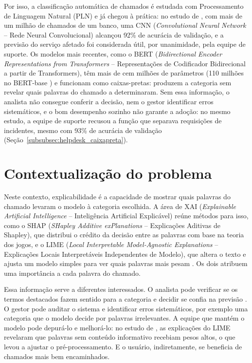 \documentclass[
    12pt,                %
    openright,           %
    oneside,             %
    a4paper,             %
    english,             %
    brazil               %
]{abntex2}
\begin{document}
Por isso, a classificação automática de chamados é estudada com Processamento de Linguagem Natural (PLN) e já chegou à prática: no estudo de , com mais de um milhão de chamados de um banco, uma CNN (\textit{Convolutional Neural Network} -- Rede Neural Convolucional) alcançou 92\% de acurácia de validação, e a previsão do serviço afetado foi considerada útil, por unanimidade, pela equipe de suporte. Os modelos mais recentes, como o BERT (\textit{Bidirectional Encoder Representations from Transformers} -- Representações de Codificador Bidirecional a partir de Transformers), têm mais de cem milhões de parâmetros (110 milhões no BERT-base \cite{devlin2019}) e funcionam como caixas-pretas: produzem a categoria sem revelar quais palavras do chamado a determinaram. Sem essa informação, o analista não consegue conferir a decisão, nem o gestor identificar erros sistemáticos, e o bom desempenho sozinho não garante a adoção: no mesmo estudo, a equipe de suporte recusou a função que separava requisições de incidentes, mesmo com 93\% de acurácia de validação (Seção~\ref{subsubsec:helpdesk_caixapreta}).

\section{Contextualização do problema}
\label{sec:contexto}

Neste contexto, explicabilidade é a capacidade de mostrar quais palavras do chamado levaram o modelo à categoria escolhida. A área de XAI (\textit{Explainable Artificial Intelligence} -- Inteligência Artificial Explicável) reúne métodos para isso, como o SHAP (\textit{SHapley Additive exPlanations} -- Explicações Aditivas de Shapley), que distribui o crédito da decisão entre as palavras com base na teoria dos jogos, e o LIME (\textit{Local Interpretable Model-Agnostic Explanations} -- Explicações Locais Interpretáveis Independentes de Modelo), que altera o texto e ajusta um modelo simples para ver quais palavras mais pesam \cite{lundberg2017, ribeiro2016}. Os dois atribuem uma importância a cada palavra do chamado.

Essa informação serve a diferentes interessados. O analista pode verificar se os termos destacados fazem sentido para a categoria e decidir se confia na previsão \cite{ribeiro2016, razma2026}. O gestor pode auditar o sistema e identificar erros sistemáticos, por exemplo uma categoria que o modelo decide por palavras irrelevantes. A equipe que mantém o modelo pode depurá-lo e melhorá-lo: no estudo de , as explicações do LIME revelaram que palavras sem conteúdo informativo recebiam pesos altos, o que levou a ajustar o pré-processamento. E o usuário, indiretamente, se beneficia de chamados mais bem encaminhados.
\end{document}
